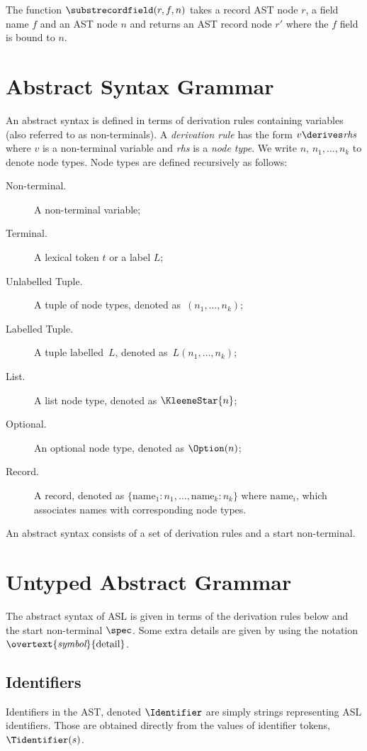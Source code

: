 \hypertarget{def-substrecordfield}{}
The function $\substrecordfield(r, f, n)$ takes a record AST node $r$, a field name $f$ and an AST node $n$
and returns an AST record node $r'$ where the $f$ field is bound to $n$.

\section{Abstract Syntax Grammar\label{sec:AbstractSyntaxGrammar}}

An abstract syntax is defined in terms of derivation rules containing variables (also referred to as non-terminals).
%
A \emph{derivation rule} has the form $v \derives \textit{rhs}$ where $v$ is a non-terminal variable and \textit{rhs} is a \emph{node type}. We write $n$, $n_1,\ldots,n_k$ to denote node types.
%
Node types are defined recursively as follows:
\begin{description}
\item[Non-terminal.] A non-terminal variable;
\item[Terminal.] A lexical token $t$ or a label $L$;
\item[Unlabelled Tuple.] A tuple of node types, denoted as~$(n_1,\ldots,n_k)$;
\item[Labelled Tuple.] A tuple labelled~$L$, denoted as~$L(n_1,\ldots,n_k)$;
\item[List.] A list node type, denoted as $\KleeneStar{n}$;
\item[Optional.] An optional node type, denoted as $\Option(n)$;
\item[Record.] A record, denoted as $\{\text{name}_1 : n_1,\ldots,\text{name}_k : n_k\}$ where $\text{name}_i$, which associates names with corresponding node types.
\end{description}

\newpage

An abstract syntax consists of a set of derivation rules and a start non-terminal.

\section{Untyped Abstract Grammar\label{sec:UntypedAbstractGrammar}}

The abstract syntax of ASL is given in terms of the derivation rules below and the start non-terminal $\spec$.
%
Some extra details are given by using the notation $\overtext{\textit{symbol}}{\text{detail}}$.

\subsection{Identifiers \label{sec:Identifiers}}
Identifiers in the AST, denoted $\Identifier$ are simply strings representing ASL identifiers.
Those are obtained directly from the values of identifier tokens, $\Tidentifier(s)$.


